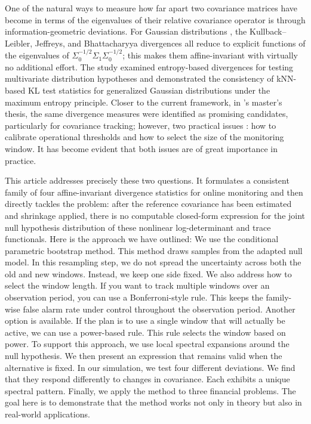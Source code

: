 \documentclass[11pt,a4paper]{article}
\begin{document}
One of the natural ways to measure how far apart two covariance matrices have become
in terms of the eigenvalues of their relative covariance operator
is through information-geometric deviations. For Gaussian distributions
, the Kullback–Leibler, Jeffreys, and Bhattacharyya divergences
all reduce to explicit functions of the eigenvalues of
$\Sigma_{0}^{-1/2}\Sigma_{1}\Sigma_{0}^{-1/2}$; this makes them
affine-invariant with virtually no additional effort. The study \citet{cadirci2022entropy}
examined entropy-based divergences for testing multivariate distribution hypotheses
and demonstrated the consistency of kNN-based KL test statistics for generalized Gaussian distributions
under the maximum entropy principle. Closer
to the current framework, in \citet{erdtman2023}’s master’s thesis,
the same divergence measures were identified as promising
candidates, particularly for covariance tracking; however, two practical issues
: how to calibrate operational thresholds and
how to select the size of the monitoring window. It has become evident that both issues
are of great importance in practice.

This article addresses precisely these two questions. It formulates a consistent
family of four affine-invariant divergence statistics for online monitoring
 and then directly tackles the problem: after the reference covariance has been estimated and shrinkage applied, there is no computable closed-form expression for the joint null hypothesis distribution of these nonlinear log-determinant and trace functionals. Here is the approach we have outlined: We use the conditional parametric bootstrap method. This method draws samples from the adapted null model. In this resampling step, we do not spread the uncertainty across both the old and new windows. Instead, we keep one side fixed. We also address how to select the window length. If you want to track multiple windows over an observation period, you can use a Bonferroni-style rule. This keeps the family-wise false alarm rate under control throughout the observation period. Another option is available. If the  plan is to use a single window that will actually be active, we can use a power-based rule. This rule selects the window based on power. To support this approach, we use local spectral expansions around the null hypothesis. We then present an expression that remains valid when the alternative is fixed. In our simulation, we test four different deviations. We find that they respond differently to changes in covariance. Each exhibits a unique spectral pattern. Finally, we apply the method to three financial problems. The goal here is to demonstrate that the method works not only in theory but also in real-world applications.
\end{document}
